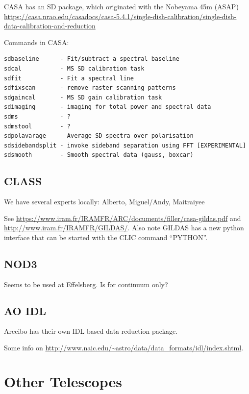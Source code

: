 \documentclass[12pt,a4paper]{article}
\begin{document}
CASA has an SD package, which originated with the Nobeyama 45m (ASAP)\newline
  \url{https://casa.nrao.edu/casadocs/casa-5.4.1/single-dish-calibration/single-dish-data-calibration-and-reduction}


  Commands in CASA:
  
\begin{verbatim}
sdbaseline      - Fit/subtract a spectral baseline
sdcal           - MS SD calibration task
sdfit           - Fit a spectral line
sdfixscan       - remove raster scanning patterns
sdgaincal       - MS SD gain calibration task
sdimaging       - imaging for total power and spectral data
sdms            - ?
sdmstool        - ?
sdpolavarage    - Average SD spectra over polarisation
sdsidebandsplit - invoke sideband separation using FFT [EXPERIMENTAL]
sdsmooth        - Smooth spectral data (gauss, boxcar)
\end{verbatim}
  
\subsection{CLASS}

We have several experts locally: Alberto, Miguel/Andy, Maitraiyee
  
See \url{https://www.iram.fr/IRAMFR/ARC/documents/filler/casa-gildas.pdf}
and \url{http://www.iram.fr/IRAMFR/GILDAS/}. Also note GILDAS has
a new python interface that can be started with the CLIC command ``PYTHON''.

\subsection{NOD3}

Seems to be used at Effelsberg.  Is for continuum only?

\subsection{AO IDL}

Arecibo has their own IDL based data reduction package.

Some info on \url{http://www.naic.edu/~astro/data/data_formats/idl/index.shtml}.

\section{Other Telescopes}
\end{document}

